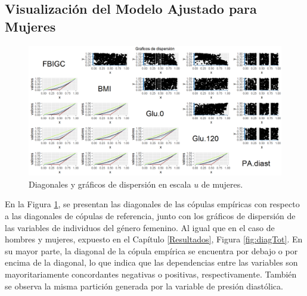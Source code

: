 
\begin{landscape}
\subsection{Visualización del Modelo Ajustado para Mujeres}

\begin{figure}[H]
    \centering
    \includegraphics[height = 13.5 cm, width = 1.4 \textwidth]{4img/UdiagM.png}
    \caption{Diagonales y gráficos de dispersión en escala $u$ de mujeres.}
    \label{fig:diagMU}
\end{figure}
\end{landscape}

En la Figura \ref{fig:diagMU}, se presentan las diagonales de las cópulas empíricas con respecto a las diagonales de cópulas de referencia, junto con los gráficos de dispersión de las variables de individuos del género femenino. Al igual que en el caso de hombres y mujeres, expuesto en el Capítulo \ref{Resultados}, Figura \ref{fig:diagTot}. En su mayor parte, la diagonal de la cópula empírica se encuentra por debajo o por encima de la diagonal, lo que indica que las dependencias entre las variables son mayoritariamente concordantes negativas o positivas, respectivamente. También se observa la misma partición generada por la variable de presión diastólica.


